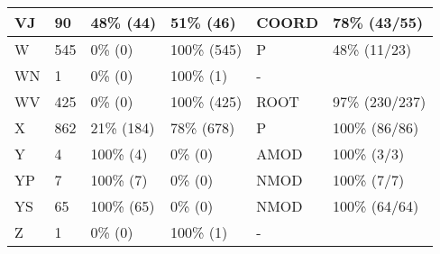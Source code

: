 \begin{figure*}
\begin{tabular}{|l|l|l|l||l|l|}
\hline
 VJ & 90 & 48\% (44) & 51\% (46) & COORD & 78\% (43/55) \\ 
\hline
 W & 545 & 0\% (0) & 100\% (545) & P & 48\% (11/23) \\ 
\hline
 WN & 1 & 0\% (0) & 100\% (1) & - &  \\ 
\hline
 WV & 425 & 0\% (0) & 100\% (425) & ROOT & 97\% (230/237) \\ 
\hline
 X & 862 & 21\% (184) & 78\% (678) & P & 100\% (86/86) \\ 
\hline
 Y & 4 & 100\% (4) & 0\% (0) & AMOD & 100\% (3/3) \\ 
\hline
 YP & 7 & 100\% (7) & 0\% (0) & NMOD & 100\% (7/7) \\ 
\hline
 YS & 65 & 100\% (65) & 0\% (0) & NMOD & 100\% (64/64) \\ 
\hline
 Z & 1 & 0\% (0) & 100\% (1) & - &  \\ 
\hline
\end{tabular}
\end{figure*}
